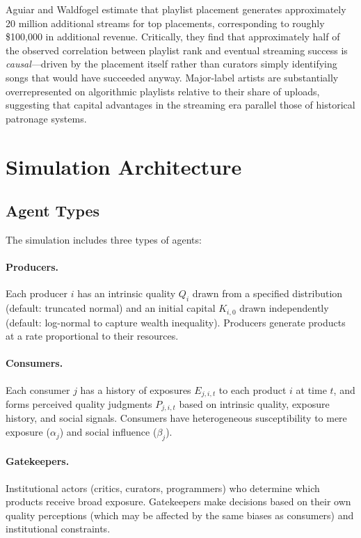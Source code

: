\documentclass[11pt,a4paper]{article}
\begin{document}
Aguiar and Waldfogel estimate that playlist placement generates approximately 20 million additional streams for top placements, corresponding to roughly \$100,000 in additional revenue. Critically, they find that approximately half of the observed correlation between playlist rank and eventual streaming success is \textit{causal}---driven by the placement itself rather than curators simply identifying songs that would have succeeded anyway. Major-label artists are substantially overrepresented on algorithmic playlists relative to their share of uploads, suggesting that capital advantages in the streaming era parallel those of historical patronage systems.

\section{Simulation Architecture}
\label{sec:architecture}

\subsection{Agent Types}

The simulation includes three types of agents:

\paragraph{Producers.} Each producer $i$ has an intrinsic quality $Q_i$ drawn from a specified distribution (default: truncated normal) and an initial capital $K_{i,0}$ drawn independently (default: log-normal to capture wealth inequality). Producers generate products at a rate proportional to their resources.

\paragraph{Consumers.} Each consumer $j$ has a history of exposures $E_{j,i,t}$ to each product $i$ at time $t$, and forms perceived quality judgments $P_{j,i,t}$ based on intrinsic quality, exposure history, and social signals. Consumers have heterogeneous susceptibility to mere exposure ($\alpha_j$) and social influence ($\beta_j$).

\paragraph{Gatekeepers.} Institutional actors (critics, curators, programmers) who determine which products receive broad exposure. Gatekeepers make decisions based on their own quality perceptions (which may be affected by the same biases as consumers) and institutional constraints.
\end{document}
